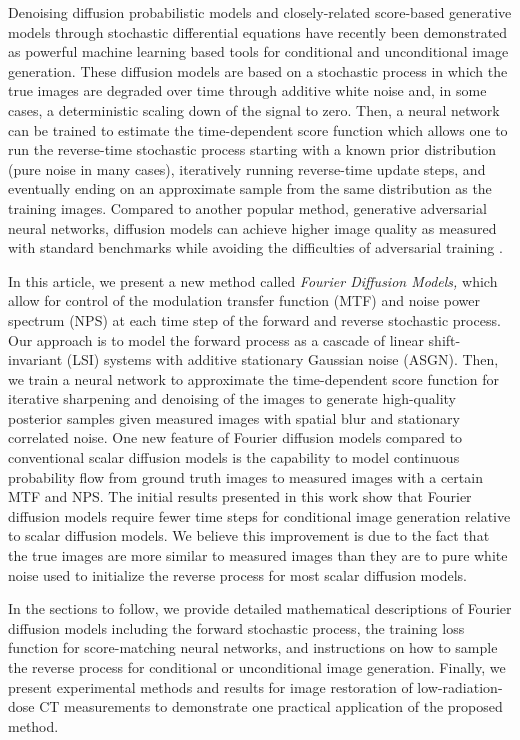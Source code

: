 \documentclass[12pt,]{article}
\begin{document}
Denoising diffusion probabilistic models \cite{sohl2015deep, ho2020denoising} and closely-related score-based generative models through stochastic differential equations \cite{song2020score} have recently been demonstrated as powerful machine learning based tools for conditional and unconditional image generation. These diffusion models are based on a stochastic process in which the true images are degraded over time through additive white noise and, in some cases, a deterministic scaling down of the signal to zero. Then, a neural network can be trained to estimate the time-dependent score function which allows one to run the reverse-time stochastic process starting with a known prior distribution (pure noise in many cases), iteratively running reverse-time update steps, and eventually ending on an approximate sample from the same distribution as the training images. Compared to another popular method, generative adversarial neural networks, diffusion models can achieve higher image quality as measured with standard benchmarks while avoiding the difficulties of adversarial training \cite{dhariwal2021diffusion}. 


In this article, we present a new method called \emph{Fourier Diffusion Models,} which allow for  control of the modulation transfer function (MTF) and noise power spectrum (NPS) at each time step of the forward and reverse stochastic process. Our approach is to model the forward process as a cascade of linear shift-invariant (LSI) systems with additive stationary Gaussian noise (ASGN). Then, we train a neural network to approximate the time-dependent score function for iterative sharpening and denoising of the images to generate high-quality posterior samples given measured images with spatial blur and stationary correlated noise. One new feature of Fourier diffusion models compared to conventional scalar diffusion models is the capability to model continuous probability flow from ground truth images to measured images with a certain MTF and NPS. The initial results presented in this work show that Fourier diffusion models require fewer time steps for conditional image generation relative to scalar diffusion models. We believe this improvement is due to the fact that the true images are more similar to measured images than they are to pure white noise used to initialize the reverse process for most scalar diffusion models.

In the sections to follow, we provide detailed mathematical descriptions of Fourier diffusion models including the forward stochastic process, the training loss function for score-matching neural networks, and instructions on how to sample the reverse process for conditional or unconditional image generation. Finally, we present experimental methods and results for image restoration of low-radiation-dose CT measurements to demonstrate one practical application of the proposed method.
\end{document}
